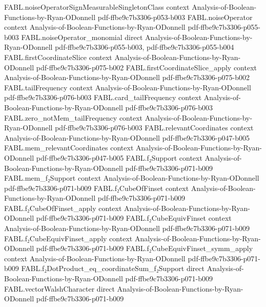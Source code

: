 \begin{theorem}
\proofstep
  {FABL.noiseOperatorSignMeasurableSingletonClass}
  {context}
  {Analysis-of-Boolean-Functions-by-Ryan-ODonnell}
  {pdf-ffbe9c7b3306-p053-b003}
\proofstep
  {FABL.noiseOperator}
  {context}
  {Analysis-of-Boolean-Functions-by-Ryan-ODonnell}
  {pdf-ffbe9c7b3306-p055-b003}
\proofstep
  {FABL.noiseOperator_monomial}
  {direct}
  {Analysis-of-Boolean-Functions-by-Ryan-ODonnell}
  {pdf-ffbe9c7b3306-p055-b003,
    pdf-ffbe9c7b3306-p055-b004}
\proofstep
  {FABL.firstCoordinateSlice}
  {context}
  {Analysis-of-Boolean-Functions-by-Ryan-ODonnell}
  {pdf-ffbe9c7b3306-p075-b002}
\proofstep
  {FABL.firstCoordinateSlice_apply}
  {context}
  {Analysis-of-Boolean-Functions-by-Ryan-ODonnell}
  {pdf-ffbe9c7b3306-p075-b002}
\proofstep
  {FABL.tailFrequency}
  {context}
  {Analysis-of-Boolean-Functions-by-Ryan-ODonnell}
  {pdf-ffbe9c7b3306-p076-b003}
\proofstep
  {FABL.card_tailFrequency}
  {context}
  {Analysis-of-Boolean-Functions-by-Ryan-ODonnell}
  {pdf-ffbe9c7b3306-p076-b003}
\proofstep
  {FABL.zero_notMem_tailFrequency}
  {context}
  {Analysis-of-Boolean-Functions-by-Ryan-ODonnell}
  {pdf-ffbe9c7b3306-p076-b003}
\proofstep
  {FABL.relevantCoordinates}
  {context}
  {Analysis-of-Boolean-Functions-by-Ryan-ODonnell}
  {pdf-ffbe9c7b3306-p047-b005}
\proofstep
  {FABL.mem_relevantCoordinates}
  {context}
  {Analysis-of-Boolean-Functions-by-Ryan-ODonnell}
  {pdf-ffbe9c7b3306-p047-b005}
\proofstep
  {FABL.f₂Support}
  {context}
  {Analysis-of-Boolean-Functions-by-Ryan-ODonnell}
  {pdf-ffbe9c7b3306-p071-b009}
\proofstep
  {FABL.mem_f₂Support}
  {context}
  {Analysis-of-Boolean-Functions-by-Ryan-ODonnell}
  {pdf-ffbe9c7b3306-p071-b009}
\proofstep
  {FABL.f₂CubeOfFinset}
  {context}
  {Analysis-of-Boolean-Functions-by-Ryan-ODonnell}
  {pdf-ffbe9c7b3306-p071-b009}
\proofstep
  {FABL.f₂CubeOfFinset_apply}
  {context}
  {Analysis-of-Boolean-Functions-by-Ryan-ODonnell}
  {pdf-ffbe9c7b3306-p071-b009}
\proofstep
  {FABL.f₂CubeEquivFinset}
  {context}
  {Analysis-of-Boolean-Functions-by-Ryan-ODonnell}
  {pdf-ffbe9c7b3306-p071-b009}
\proofstep
  {FABL.f₂CubeEquivFinset_apply}
  {context}
  {Analysis-of-Boolean-Functions-by-Ryan-ODonnell}
  {pdf-ffbe9c7b3306-p071-b009}
\proofstep
  {FABL.f₂CubeEquivFinset_symm_apply}
  {context}
  {Analysis-of-Boolean-Functions-by-Ryan-ODonnell}
  {pdf-ffbe9c7b3306-p071-b009}
\proofstep
  {FABL.f₂DotProduct_eq_coordinateSum_f₂Support}
  {direct}
  {Analysis-of-Boolean-Functions-by-Ryan-ODonnell}
  {pdf-ffbe9c7b3306-p071-b009}
\proofstep
  {FABL.vectorWalshCharacter}
  {direct}
  {Analysis-of-Boolean-Functions-by-Ryan-ODonnell}
  {pdf-ffbe9c7b3306-p071-b009}

\end{theorem}
